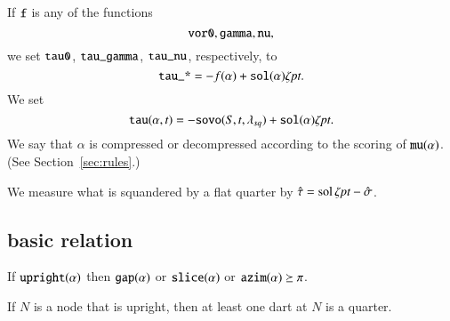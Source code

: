 If ${\operatorname{{\texttt{f}}}}$ is any of the
functions
    $${\operatorname{{\texttt{vor0}}}},{\operatorname{{\texttt{gamma}}}}, {\operatorname{{\texttt{nu}}}},$$
we set ${\operatorname{{\texttt{tau0}}}}$, ${\operatorname{{\texttt{tau\_gamma}}}}$,
${\operatorname{{\texttt{tau\_nu}}}}$, respectively,
to
    $${\operatorname{{\texttt{tau\_*}}}} = -f(\alpha) +{\operatorname{{\texttt{sol}}}}(\alpha)\zeta\hbox{\it pt}.$$
We set
    $$
    {\operatorname{{\texttt{tau}}}}(\alpha,t) = -
    {\operatorname{{\texttt{sovo}}}}(S,t,\lambda_{sq})+{\operatorname{{\texttt{sol}}}}(\alpha)\zeta\hbox{\it pt}.
    $$
We say that $\alpha$ is compressed or decompressed 
according to the scoring of ${\operatorname{{\texttt{mu}}}}(\alpha)$.  (See
Section~\ref{sec:rules}.)

We  measure what is squandered by a flat quarter by $\hat\tau =
\operatorname{sol}\zeta\hbox{\it pt} - \hat\sigma$.


\subsection{basic relation}

\begin{lemma} If ${\operatorname{{\texttt{upright}}}}(\alpha)$ then ${\operatorname{{\texttt{gap}}}}(\alpha)$ or
${\operatorname{{\texttt{slice}}}}(\alpha)$ or ${\operatorname{{\texttt{azim}}}}(\alpha) \succeq \pi$.
\end{lemma}


\begin{lemma}  If $N$ is a node that is upright, then at least
one dart at $N$ is a quarter.
\end{lemma}


